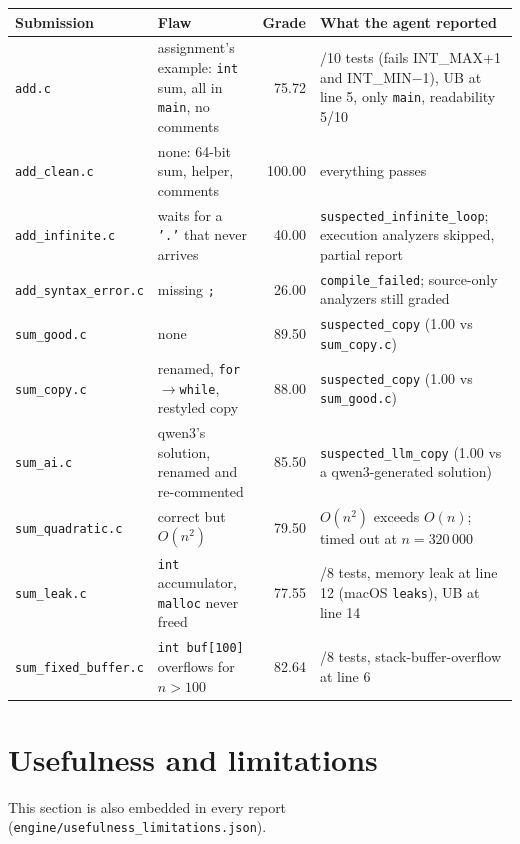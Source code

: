 \documentclass[11pt,a4paper]{article}
\newcommand{\file}[1]{\nolinkurl{#1}}
\begin{document}
\begin{longtable}{@{}>{\raggedright\arraybackslash}p{3.1cm}>{\raggedright\arraybackslash}p{4.3cm}r>{\raggedright\arraybackslash}p{6.1cm}@{}}
\toprule
\textbf{Submission} & \textbf{Flaw} & \textbf{Grade} & \textbf{What the agent reported} \\
\midrule
\endhead
\file{add.c} & assignment's example: \texttt{int} sum, all in \texttt{main}, no comments & 75.72 & 8/10 tests (fails INT\_MAX+1 and INT\_MIN$-$1), UB at line 5, only \texttt{main}, readability 5/10 \\
\file{add_clean.c} & none: 64-bit sum, helper, comments & 100.00 & everything passes \\
\file{add_infinite.c} & waits for a \texttt{'.'} that never arrives & 40.00 & \texttt{suspected\_infinite\_loop}; execution analyzers skipped, partial report \\
\file{add_syntax_error.c} & missing \texttt{;} & 26.00 & \texttt{compile\_failed}; source-only analyzers still graded \\
\file{sum_good.c} & none & 89.50 & \texttt{suspected\_copy} (1.00 vs \file{sum_copy.c}) \\
\file{sum_copy.c} & renamed, \texttt{for}$\rightarrow$\texttt{while}, restyled copy & 88.00 & \texttt{suspected\_copy} (1.00 vs \file{sum_good.c}) \\
\file{sum_ai.c} & qwen3's solution, renamed and re-commented & 85.50 & \texttt{suspected\_llm\_copy} (1.00 vs a qwen3-generated solution) \\
\file{sum_quadratic.c} & correct but $O(n^2)$ & 79.50 & $O(n^2)$ exceeds $O(n)$; timed out at $n=320\,000$ \\
\file{sum_leak.c} & \texttt{int} accumulator, \texttt{malloc} never freed & 77.55 & 5/8 tests, memory leak at line 12 (macOS \texttt{leaks}), UB at line 14 \\
\file{sum_fixed_buffer.c} & \texttt{int buf[100]} overflows for $n>100$ & 82.64 & 6/8 tests, stack-buffer-overflow at line 6 \\
\bottomrule
\end{longtable}

\section{Usefulness and limitations}
This section is also embedded in every report (\file{engine/usefulness_limitations.json}).
\end{document}
